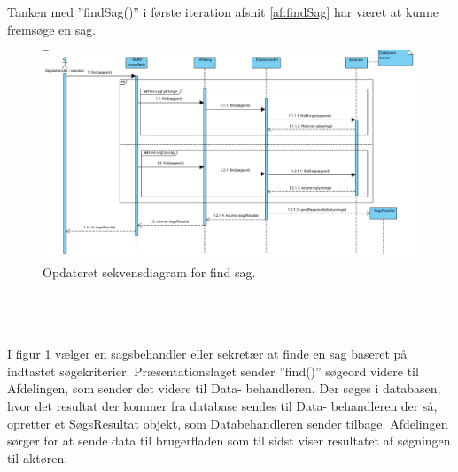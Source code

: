 Tanken med ”findSag()” i første iteration afsnit \ref{af:findSag} har været at kunne fremsøge en sag.\\
\begin{figure}[htb!]
  \includegraphics[scale = 0.56]{./PNG/analyse/find.PNG} 
  \caption{Opdateret sekvensdiagram for find sag.}
  \label{fig:2find}
\end{figure} 
\\ \\ \\
I figur \ref{fig:2find} vælger en sagsbehandler eller sekretær at finde en sag baseret på indtastet søgekriterier. Præsentationslaget sender ”find()” søgeord videre til Afdelingen, som sender det videre til Data- behandleren. Der søges i databasen, hvor det resultat der kommer fra database sendes til Data- behandleren der så, opretter et SøgsResultat objekt, som Databehandleren sender tilbage. Afdelingen sørger for at sende data til brugerfladen som til sidst viser resultatet af søgningen til aktøren. \\ 